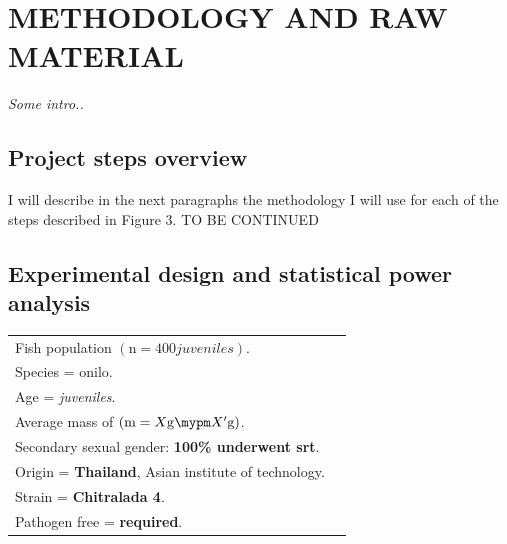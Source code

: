 \setlength{\footskip}{8mm}

\chapter{METHODOLOGY AND RAW MATERIAL}
\label{ch:methodology}


\textit{Some intro..}

\section{Project steps overview}

I will describe in the next paragraphs the methodology I will use for each of the steps described in Figure 3. TO BE CONTINUED

\section{Experimental design and statistical power analysis}


\begin{center} 
  \begin{flushleft}
  \textwidth
  \caption{\textbf{Table 2.1 } \\
  ~ \\
  \subcaption{\textit{Informations about animals and their origins} \\
  ~ \\
  \end{flushleft} 
  \textwidth
  \begin{tabular}{ll}
    Fish population $(\mathrm{n} = 400 juveniles)$. \\
    Species = \ac{onilo}. \\
    Age = \textit{juveniles}. \\  
    Average mass of $(\mathrm{m} = X\si{\gram} \mypm X'\si{\gram})$. \\
    Secondary sexual gender: \textbf{ 100\% underwent \ac{srt}}. \\
    Origin = \textbf{Thailand}, Asian institute of technology. \\
    Strain = \textbf{Chitralada 4}. \\
    Pathogen free = \textbf{required}. \\
  \end{tabular}
\end{center}

